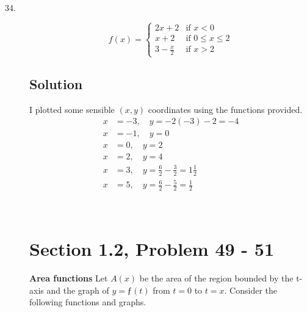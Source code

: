 \documentclass{article}
\newcommand{\problem}[2]{\vspace{5ex}\section*{Section #1, Problem #2}}
\newcommand{\solution}{\subsection*{Solution}}
\begin{document}
\begin{description}
\item[34.]
  \[
    f(x) = \begin{cases}
             2x + 2 &\text{if } x < 0 \\
             x + 2 &\text{if } 0 \leq x \leq 2 \\
             3 - \frac{x}{2} &\text{if } x > 2
           \end{cases}
  \]
  \solution{}
  \begin{multicols}{2}
  I plotted some sensible $(x,y)$ coordinates using the functions provided.
  \begin{align*}
    x &= -3, \quad y = -2(-3)-2 = -4 \\
    x &= -1, \quad y = 0 \\
    x &= 0, \quad y = 2 \\
    x &= 2, \quad y = 4 \\
    x &= 3, \quad y = \frac{6}{2} - \frac{3}{2} = 1\frac{1}{2} \\
    x &= 5, \quad y = \frac{6}{2} - \frac{5}{2} = \frac{1}{2}
  \end{align*}

  \columnbreak\
  \begin{figure}[H]
    \end{figure}
  \end{multicols}

\problem{1.2}{49 \-- 51}

  \textbf{Area functions} Let $A(x)$ be the area of the region bounded by the t-axis and the graph of
  $y = ƒ(t)$ from $t = 0$ to $t = x$. Consider the following functions and graphs.



\end{description}
\end{document}

